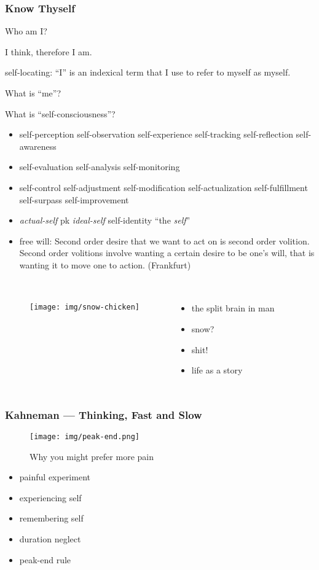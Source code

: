 \documentclass[UTF8,aspectratio=43,11pt,colorlinks,compress,openany]{beamer}%
\begin{document}
\begin{frame}\frametitle{Know Thyself}
\centerline{\Huge Who am I?}
\centerline{I think, therefore I am.}
\centerline{self-locating: ``I'' is an indexical term that I use to refer to myself as myself.}
\centerline{What is ``me''?}
\centerline{\Large What is ``self-consciousness''?}
\begin{itemize}
	\item self-perception self-observation self-experience self-tracking self-reflection self-awareness
	\item self-evaluation self-analysis self-monitoring
	\item self-control self-adjustment self-modification self-actualization self-fulfillment self-surpass self-improvement
	\item \emph{actual-self} pk \emph{ideal-self} self-identity ``the \emph{self}''
	\item free will: Second order desire that we want to act on is second order volition. Second order volitions involve wanting a certain desire to be one's will, that is wanting it to move one to action. (Frankfurt)
\end{itemize}
\end{frame}

\begin{frame}\frametitle{}
\begin{columns}
	\begin{figure}[H]
		\begin{center}
			\texttt{[image: img/snow-chicken]}
		\end{center}
	\end{figure}
\begin{itemize}
	\item the split brain in man
	\item snow?
	\item shit!
	\item life as a story
\end{itemize}
\end{columns}
\end{frame}

\begin{frame}\frametitle{Kahneman --- Thinking, Fast and Slow}
	\begin{figure}[H]
		\begin{center}
			\texttt{[image: img/peak-end.png]}\caption{Why you might prefer more pain}
		\end{center}
	\end{figure}
\begin{itemize}
	\item painful experiment
	\item experiencing self
	\item remembering self
	\item duration neglect
	\item peak-end rule
\end{itemize}
\end{frame}
\end{document}
